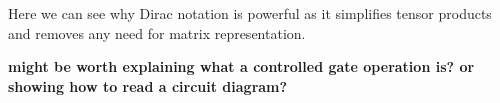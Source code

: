 \documentclass[twocolumn,showpacs,preprintnumbers,amsmath,amssymb]{revtex4}
\begin{document}
		Here we can see why Dirac notation is powerful as it simplifies tensor products and removes any need for matrix representation.
		
		
		\textbf{might be worth explaining what a controlled gate operation is? or showing how to read a circuit diagram?}
		
			
		
			
		
		
	
\end{document}
